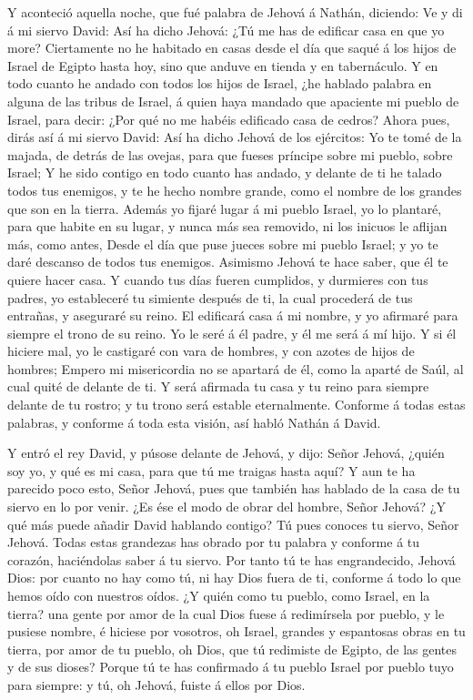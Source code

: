  Y aconteció aquella noche, que fué palabra de Jehová á
Nathán, diciendo:  Ve y di á mi siervo David: Así ha dicho
Jehová: ¿Tú me has de edificar casa en que yo more? 
Ciertamente no he habitado en casas desde el día que saqué á los hijos
de Israel de Egipto hasta hoy, sino que anduve en tienda y en
tabernáculo.  Y en todo cuanto he andado con todos los hijos
de Israel, ¿he hablado palabra en alguna de las tribus de Israel, á
quien haya mandado que apaciente mi pueblo de Israel, para decir: ¿Por
qué no me habéis edificado casa de cedros?  Ahora pues,
dirás así á mi siervo David: Así ha dicho Jehová de los ejércitos: Yo te
tomé de la majada, de detrás de las ovejas, para que fueses príncipe
sobre mi pueblo, sobre Israel;  Y he sido contigo en todo
cuanto has andado, y delante de ti he talado todos tus enemigos, y te he
hecho nombre grande, como el nombre de los grandes que son en la tierra.
 Además yo fijaré lugar á mi pueblo Israel, yo lo plantaré,
para que habite en su lugar, y nunca más sea removido, ni los inicuos le
aflijan más, como antes,  Desde el día que puse jueces
sobre mi pueblo Israel; y yo te daré descanso de todos tus enemigos.
Asimismo Jehová te hace saber, que él te quiere hacer casa.
 Y cuando tus días fueren cumplidos, y durmieres con tus
padres, yo estableceré tu simiente después de ti, la cual procederá de
tus entrañas, y aseguraré su reino.  El edificará casa á mi
nombre, y yo afirmaré para siempre el trono de su reino. 
Yo le seré á él padre, y él me será á mí hijo. Y si él hiciere mal, yo
le castigaré con vara de hombres, y con azotes de hijos de hombres;
 Empero mi misericordia no se apartará de él, como la
aparté de Saúl, al cual quité de delante de ti.  Y será
afirmada tu casa y tu reino para siempre delante de tu rostro; y tu
trono será estable eternalmente.  Conforme á todas estas
palabras, y conforme á toda esta visión, así habló Nathán á David.

 Y entró el rey David, y púsose delante de Jehová, y dijo:
Señor Jehová, ¿quién soy yo, y qué es mi casa, para que tú me traigas
hasta aquí?  Y aun te ha parecido poco esto, Señor Jehová,
pues que también has hablado de la casa de tu siervo en lo por venir.
¿Es ése el modo de obrar del hombre, Señor Jehová?  ¿Y qué
más puede añadir David hablando contigo? Tú pues conoces tu siervo,
Señor Jehová.  Todas estas grandezas has obrado por tu
palabra y conforme á tu corazón, haciéndolas saber á tu siervo.
 Por tanto tú te has engrandecido, Jehová Dios: por cuanto
no hay como tú, ni hay Dios fuera de ti, conforme á todo lo que hemos
oído con nuestros oídos.  ¿Y quién como tu pueblo, como
Israel, en la tierra? una gente por amor de la cual Dios fuese á
redimírsela por pueblo, y le pusiese nombre, é hiciese por vosotros, oh
Israel, grandes y espantosas obras en tu tierra, por amor de tu pueblo,
oh Dios, que tú redimiste de Egipto, de las gentes y de sus dioses?
 Porque tú te has confirmado á tu pueblo Israel por pueblo
tuyo para siempre: y tú, oh Jehová, fuiste á ellos por Dios.

